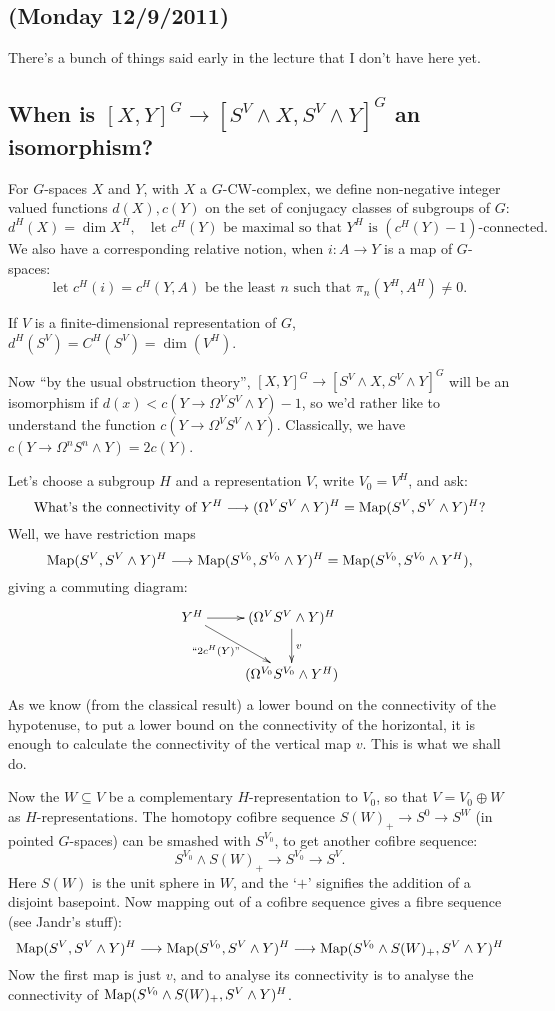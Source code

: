 \documentclass[11pt]{article}
\newcommand{\NewLecture}[3]{\section{#1 {\small(#2/#3/2011)}}}
\begin{document}
\begin{ThirdWeek}
\setcounter{section}{4}
\NewLecture{}{Monday 12}{9}
There's a bunch of things said early in the lecture that I don't have here yet.
\subsection*{When is $[X,Y]^G\to[S^V\wedge X,S^V\wedge Y]^G$ an isomorphism?}
For $G$-spaces $X$ and $Y$, with $X$ a $G$-CW-complex, we define non-negative integer valued functions $d(X),c(Y)$ on the set of conjugacy classes of subgroups of $G$:
\[d^H(X)=\dim X^H,\quad \text{let $c^H(Y)$ be maximal so that $Y^H$ is $(c^H(Y)-1)$-connected.}\]
We also have a corresponding relative notion, when $i:A\to Y$ is a map of $G$-spaces:
\[\text{let $c^H(i)=c^H(Y,A)$ be the least $n$ such that $\pi_n(Y^H,A^H)\neq0$.}\]
\begin{exmp*}
If $V$ is a finite-dimensional representation of $G$, $d^H(S^V)=C^H(S^V)=\dim (V^H)$.
\end{exmp*}
Now ``by the usual obstruction theory'', $[X,Y]^G\to[S^V\wedge X,S^V\wedge Y]^G$ will be an isomorphism if $d(x)<c(Y\to\Omega^VS^V\wedge Y)-1$, so we'd rather like to understand the function $c(Y\to\Omega^VS^V\wedge Y)$. Classically, we have $c(Y\to\Omega^nS^n\wedge Y)=2c(Y)$.

Let's choose a subgroup $H$ and a representation $V$, write $V_0=V^H$, and ask:
\[\text{What's the connectivity of }
Y^H\longrightarrow(\Omega^VS^V\wedge Y)^H=\operatorname{Map}(S^V,S^V\wedge Y)^H?\]
Well, we have restriction maps
\[\operatorname{Map}(S^V,S^V\wedge Y)^H\longrightarrow\operatorname{Map}(S^{V_0},S^{V_0}\wedge Y)^H=\operatorname{Map}(S^{V_0},S^{V_0}\wedge Y^H),\]
giving a commuting diagram:
\[\xymatrix{
Y^H\ar[r]\ar[dr]_(.4){\text{``$2c^H(Y)$''}}&(\Omega^VS^V\wedge Y)^H\ar[d]^v\\
&(\Omega^{V_0}S^{V_0}\wedge Y^H)
}\]
As we know (from the classical result) a lower bound on the connectivity of the hypotenuse, to put a lower bound on the connectivity of the horizontal, it is enough to calculate the connectivity of the vertical map $v$. This is what we shall do.

Now the $W\subseteq V$ be a complementary $H$-representation to $V_0$, so that $V=V_0\oplus W$ as $H$-representations. The homotopy cofibre sequence $S(W)_+\to S^0\to S^W$ (in pointed $G$-spaces) can be smashed with $S^{V_0}$, to get another cofibre sequence:
\[S^{V_0}\wedge S(W)_+\to S^{V_0}\to S^V.\]
Here $S(W)$ is the unit sphere in $W$, and the `$+$' signifies the addition of a disjoint basepoint. Now mapping out of a cofibre sequence gives a fibre sequence (see Jandr's stuff):
\[\operatorname{Map}(S^V,S^V\wedge Y)^H\longrightarrow\operatorname{Map}(S^{V_0},S^V\wedge Y)^H\longrightarrow \operatorname{Map}(S^{V_0}\wedge S(W)_+,S^V\wedge Y)^H\]
Now the first map is just $v$, and to analyse its connectivity is to analyse the connectivity of $\operatorname{Map}(S^{V_0}\wedge S(W)_+,S^V\wedge Y)^H$.


\end{ThirdWeek}
\end{document}

